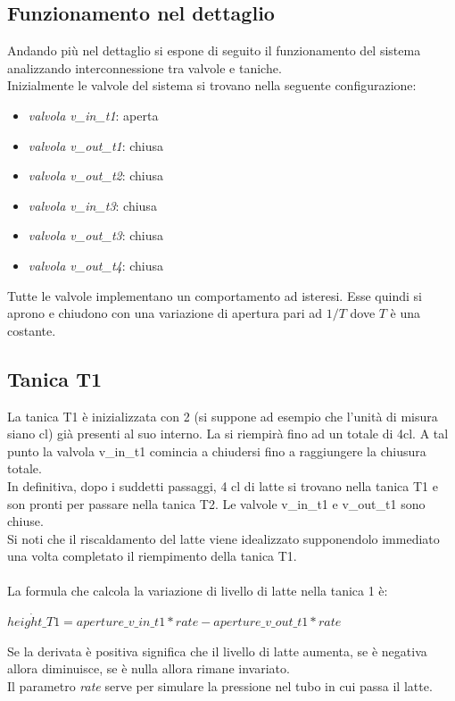 \documentclass[12pt]{article}
\begin{document}
\subsection{Funzionamento nel dettaglio}
Andando più nel dettaglio si espone di seguito il funzionamento del sistema analizzando interconnessione tra valvole e taniche.\\
Inizialmente le valvole del sistema si trovano nella seguente configurazione:
\begin{itemize}
	\item \textit{valvola v\_in\_t1}: aperta
	\item \textit{valvola v\_out\_t1}: chiusa
	\item \textit{valvola v\_out\_t2}: chiusa
	\item \textit{valvola v\_in\_t3}: chiusa
	\item \textit{valvola v\_out\_t3}: chiusa
	\item \textit{valvola v\_out\_t4}: chiusa
\end{itemize}  
Tutte le valvole implementano un comportamento ad isteresi. Esse quindi si aprono e chiudono con una variazione di apertura pari ad $1/T$ dove $T$ è una costante.

\subsection{Tanica T1}
La tanica T1 è inizializzata con 2 (si suppone ad esempio che l'unità di misura siano cl) già presenti al suo interno. La si riempirà fino ad un totale di 4cl. A tal punto la valvola v\_in\_t1 comincia a chiudersi fino a raggiungere la chiusura totale. \\
In definitiva, dopo i suddetti passaggi, 4 cl di latte si trovano nella tanica T1 e son pronti per passare nella tanica T2. Le valvole v\_in\_t1 e v\_out\_t1 sono chiuse.\\
Si noti che il riscaldamento del latte viene idealizzato supponendolo immediato una volta completato il riempimento della tanica T1.\\\\
La formula che calcola la variazione di livello di latte nella tanica 1 è:
\begin{center}
	$ \dot{height\_T1} = aperture\_v\_in\_t1*rate - aperture\_v\_out\_t1*rate$
\end{center}
Se la derivata è positiva significa che il livello di latte aumenta, se è negativa allora diminuisce, se è nulla allora rimane invariato.\\
Il parametro \textit{rate} serve per simulare la pressione nel tubo in cui passa il latte.
\end{document}
